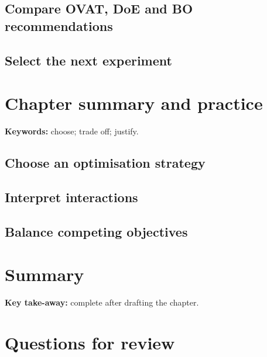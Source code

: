 
\subsection{Compare OVAT, DoE and BO recommendations}


\subsection{Select the next experiment}


\section{Chapter summary and practice}

\begin{notebox}
\textbf{Keywords:} choose; trade off; justify.
\end{notebox}

\subsection{Choose an optimisation strategy}


\subsection{Interpret interactions}


\subsection{Balance competing objectives}


\section{Summary}

\begin{notebox}
\textbf{Key take-away:} complete after drafting the chapter.
\end{notebox}

\section{Questions for review}

\solution{4cm}{%
}
